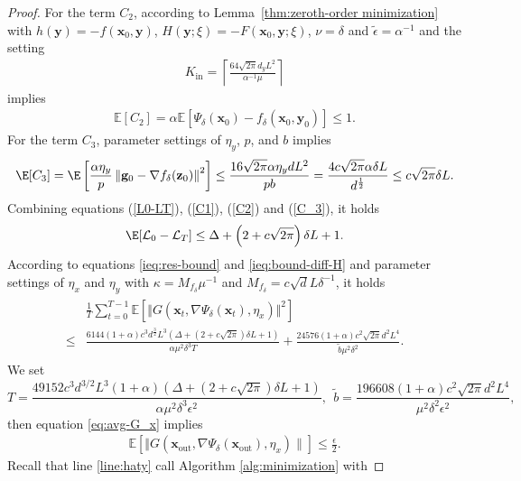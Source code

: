 \documentclass[11pt]{article}
\def\vx{\mathbf{x}}
\def\vy{\mathbf{y}}
\def\BE{{\mathbb{E}}}
\newcommand{\norm}[1]{\left\| #1 \right\|}
\begin{document}
\begin{proof}
For the term $C_2$,
according to Lemma~\ref{thm:zeroth-order minimization} with
$h(\vy)=-f(\vx_0,\vy)$, $H(\vy;\xi)=-F(\vx_0,\vy;\xi)$, $\nu=\delta$ and $\tilde\epsilon=\alpha^{-1}$ and the setting
\begin{align*}
K_{\mathrm{in}}=\left\lceil\frac{64\sqrt{2\pi} d_y L^2}{\alpha^{-1}\mu}\right\rceil
\end{align*}
implies
\begin{align}\label{C2}
\BE[C_2]=\alpha\BE[\Psi_{\delta}(\vx_0) - f_{\delta}(\vx_0, \vy_0)] \le 1.
\end{align}
For the term $C_3$, parameter settings of $\eta_y$, $p$, and $ b$ implies
\begin{align}\label{C_3}
\E[C_3] = \E\left[\frac{\alpha\eta_y}{p}\norm{\mathbf{g}_0-\nabla f_\delta(\mathbf{z}_0)}^2\right]
\le \frac{16\sqrt{2\pi}\alpha\eta_y dL^2}{pb}
= \frac{4c\sqrt{2\pi}\alpha\delta L}{d^{\frac{1}{2}}}
\le c\sqrt{2\pi}\delta L.
\end{align}
Combining equations (\ref{L0-LT}), (\ref{C1}), (\ref{C2}) and (\ref{C_3}), it holds  
\begin{align}\label{ieq:bound-diff-H}    
\E[\mathcal{L}_0-\mathcal{L}_T]\le  \Delta+ \left(2+c\sqrt{2\pi}\right)\delta L+1.
\end{align}
According to equations \eqref{ieq:res-bound} and \eqref{ieq:bound-diff-H} and parameter settings of $\eta_x$ and $\eta_y$ with $\kappa=M_{f_\delta}\mu^{-1}$ and $M_{f_\delta} =c \sqrt{d}L\delta^{-1}$,
it holds
\begin{align}\label{eq:avg-G_x} 
\begin{split}
&\frac{1}{T} \sum_{t=0}^{T-1} \BE[\Vert G(\vx_t,\nabla\Psi_\delta(\vx_t),\eta_x)  \Vert^2]\\
\leq &\frac{6144(1+\alpha)c^3d^\frac{3}{2}L^3 \left(\Delta+(2+c\sqrt{2\pi})\delta L+1\right)}{\alpha \mu^2\delta^3 T} 
 +
  \frac{24576(1+\alpha)c^2\sqrt{2\pi }d^2L^4}{\tilde{b}\mu^2\delta^2}.
  \end{split}
\end{align}
We set
\[
T=\frac{49152c^3d^{3/2}L^3(1+\alpha)\left(\Delta+(2+c\sqrt{2\pi})\delta L+1\right)}{\alpha \mu^2\delta^3 \epsilon^2},~~ \tilde{b}=\frac{196608(1+\alpha)c^2\sqrt{2\pi }d^2L^4}{\mu^2\delta^2\epsilon^2},
\]
then equation \eqref{eq:avg-G_x} implies
\begin{align}\label{gradient control 1}
\BE\left[\Vert G(\vx_{\mathrm{out}},\nabla\Psi_\delta(\vx_{\mathrm{out}}),\eta_x)\|\right]  \le \frac{\epsilon}{2}.    
\end{align}
Recall that line \ref{line:haty} call Algorithm \ref{alg:minimization} with

\end{proof}
\end{document}
